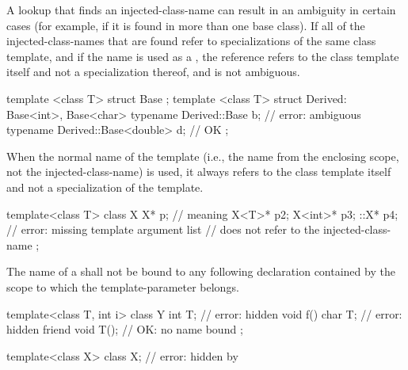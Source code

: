 \pnum
A lookup that finds an injected-class-name can result in an ambiguity in
certain cases (for example, if it is found in more than one
base class).
If all of the injected-class-names that are
found refer to specializations of the same class template,
and if the name
is used as a ,
the reference refers to the class template itself and not a
specialization thereof, and is not ambiguous.
\begin{example}
\begin{codeblock}
template <class T> struct Base { };
template <class T> struct Derived: Base<int>, Base<char> {
  typename Derived::Base b;             // error: ambiguous
  typename Derived::Base<double> d;     // OK
};
\end{codeblock}
\end{example}

\pnum
When the normal name of the template (i.e., the name from
the enclosing scope, not the injected-class-name) is
used,
it always refers to the class template itself and not a
specialization of the template.
\begin{example}
\begin{codeblock}
template<class T> class X {
  X* p;                                 // meaning 
  X<T>* p2;
  X<int>* p3;
  ::X* p4;                              // error: missing template argument list
                                        //  does not refer to the injected-class-name
};
\end{codeblock}
\end{example}

\pnum
The name of a 
shall not be bound to any following declaration contained by the scope
to which the template-parameter belongs.
\begin{example}
\begin{codeblock}
template<class T, int i> class Y {
  int T;                                // error:  hidden
  void f() {
    char T;                             // error:  hidden
  }
  friend void T();                      // OK: no name bound
};

template<class X> class X;              // error: hidden by 
\end{codeblock}
\end{example}

